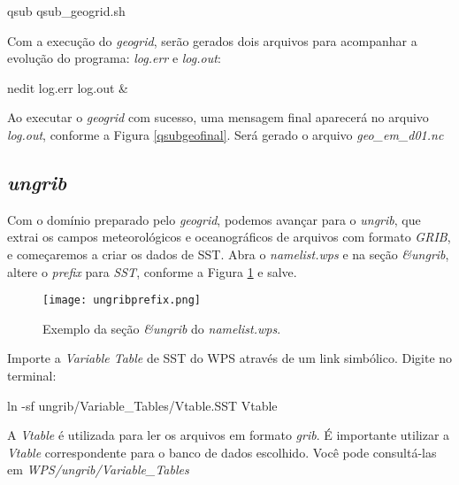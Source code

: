 \begin{bashcode}
qsub qsub_geogrid.sh
\end{bashcode}
\bigskip

\noindent Com a execução do \textit{geogrid}, serão gerados dois arquivos para acompanhar a evolução do programa: \textit{log.err} e \textit{log.out}:
\bigskip

\begin{bashcode}
nedit log.err log.out &
\end{bashcode}
\bigskip

\noindent Ao executar o \textit{geogrid} com sucesso, uma mensagem final aparecerá no arquivo \textit{log.out}, conforme a Figura \textcolor{bleu_cite}{\ref{qsubgeofinal}}. Será gerado o arquivo \textit{geo\_em\_d01.nc}
\bigskip


\subsection{\textit{ungrib}}
\bigskip
\noindent Com o domínio preparado pelo \textit{geogrid}, podemos avançar para o \textit{ungrib}, que extrai os campos meteorológicos 
          e oceanográficos de arquivos com formato \textit{GRIB}, e começaremos a criar os dados de SST. Abra o \textit{namelist.wps} 
          e na seção \textit{\&ungrib}, altere o \textit{prefix} para \textit{SST}, conforme a Figura \ref{ungribprefix} e salve.
\bigskip

\begin{figure}[H]
    \centering
    \texttt{[image: ungribprefix.png]}
    \caption{Exemplo da seção \textit{\&ungrib} do \textit{namelist.wps}.}
    \label{ungribprefix}
\end{figure}
\bigskip

\noindent Importe a \textit{Variable Table} de SST do WPS através de um link simbólico. Digite no terminal:
\bigskip

\begin{bashcode}
ln -sf ungrib/Variable_Tables/Vtable.SST Vtable
\end{bashcode}
\bigskip

\begin{tcolorbox}[enhanced,
  grow to left by=0cm,%
  grow to right by=0cm,%
  enlarge top by=0cm,%
  enlarge bottom by=0cm,%
  tcbox raise base,
  boxrule=1.0pt,
  left=18mm,
  colframe=red!50!black,coltext=red!25!black,colback=red!10!white,
  overlay={\begin{tcbclipinterior}\fill[red!75!blue!50!white] (frame.south west)
    rectangle node[text=white,font=\sffamily\bfseries\footnotesize,rotate=0] {ATENÇÃO} ([xshift=18mm]frame.north west);\end{tcbclipinterior}}]
A \textit{Vtable} é utilizada para ler os arquivos em formato \textit{grib}. É importante utilizar a \textit{Vtable} correspondente para o banco de dados escolhido. Você pode consultá-las em \textit{WPS/ungrib/Variable\_Tables}
\end{tcolorbox}
\bigskip

